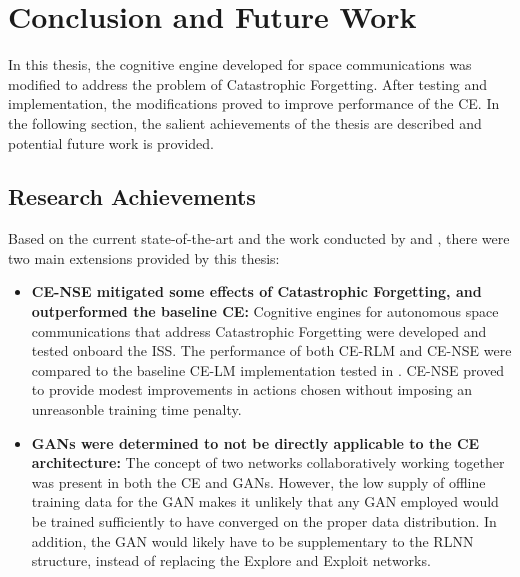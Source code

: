 \chapter{Conclusion and Future Work} \label{ch:conclusion}

\par In this thesis, the cognitive engine developed for space communications was modified to address the problem of Catastrophic Forgetting. After testing and implementation, the modifications proved to improve performance of the CE. In the following section, the salient achievements of the thesis are described and potential future work is provided.

\section{Research Achievements}
\par Based on the current state-of-the-art and the work conducted by \cite{paulo_theory_paper} and \cite{tim_implementation_paper}, there were two main extensions provided by this thesis:
\begin{itemize}
	\item \textbf{CE-NSE mitigated some effects of Catastrophic Forgetting, and outperformed the baseline CE:} Cognitive engines for autonomous space communications that address Catastrophic Forgetting were developed and tested onboard the ISS. The performance of both CE-RLM and CE-NSE were compared to the baseline CE-LM implementation tested in \cite{tim_implementation_paper}. CE-NSE proved to provide modest improvements in actions chosen without imposing an unreasonble training time penalty.

	\item \textbf{GANs were determined to not be directly applicable to the CE architecture: } The concept of two networks collaboratively working together was present in both the CE and GANs. However, the low supply of offline training data for the GAN makes it unlikely that any GAN employed would be trained sufficiently to have converged on the proper data distribution. In addition, the GAN would likely have to be supplementary to the RLNN structure, instead of replacing the Explore and Exploit networks. 
\end{itemize}

